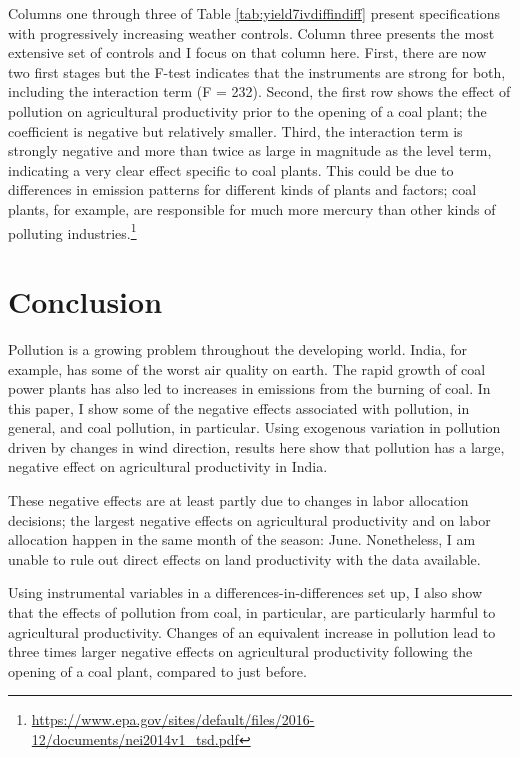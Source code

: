 \documentclass[
]{article}
\begin{document}
Columns one through three of Table \ref{tab:yield7ivdiffindiff} present specifications with progressively increasing weather controls. Column three presents the most extensive set of controls and I focus on that column here. First, there are now two first stages but the F-test indicates that the instruments are strong for both, including the interaction term (F = 232). Second, the first row shows the effect of pollution on agricultural productivity prior to the opening of a coal plant; the coefficient is negative but relatively smaller. Third, the interaction term is strongly negative and more than twice as large in magnitude as the level term, indicating a very clear effect specific to coal plants. This could be due to differences in emission patterns for different kinds of plants and factors; coal plants, for example, are responsible for much more mercury than other kinds of polluting industries.\footnote{\url{https://www.epa.gov/sites/default/files/2016-12/documents/nei2014v1_tsd.pdf}}

\hypertarget{conclusion}{%
\section{Conclusion}\label{conclusion}}

\label{conclusion}

Pollution is a growing problem throughout the developing world. India, for example, has some of the worst air quality on earth. The rapid growth of coal power plants has also led to increases in emissions from the burning of coal. In this paper, I show some of the negative effects associated with pollution, in general, and coal pollution, in particular. Using exogenous variation in pollution driven by changes in wind direction, results here show that pollution has a large, negative effect on agricultural productivity in India.

These negative effects are at least partly due to changes in labor allocation decisions; the largest negative effects on agricultural productivity and on labor allocation happen in the same month of the season: June. Nonetheless, I am unable to rule out direct effects on land productivity with the data available.

Using instrumental variables in a differences-in-differences set up, I also show that the effects of pollution from coal, in particular, are particularly harmful to agricultural productivity. Changes of an equivalent increase in pollution lead to three times larger negative effects on agricultural productivity following the opening of a coal plant, compared to just before.
\end{document}
